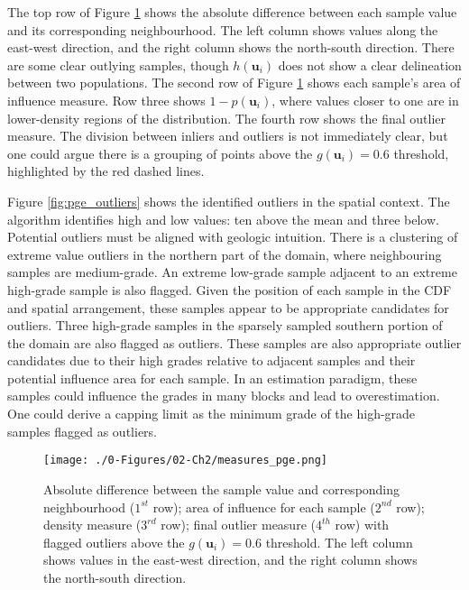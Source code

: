The top row of Figure \ref{fig:measures_pge} shows the absolute difference between each sample value and its corresponding neighbourhood. The left column shows values along the east-west direction, and the right column shows the north-south direction. There are some clear outlying samples, though $h(\mathbf{u}_{i})$ does not show a clear delineation between two populations. The second row of Figure \ref{fig:measures_pge} shows each sample's area of influence measure. Row three shows $1-p(\mathbf{u}_{i})$, where values closer to one are in lower-density regions of the distribution. The fourth row shows the final outlier measure. The division between inliers and outliers is not immediately clear, but one could argue there is a grouping of points above the $g(\mathbf{u}_{i})=0.6$ threshold, highlighted by the red dashed lines.

Figure \ref{fig:pge_outliers} shows the identified outliers in the spatial context. The algorithm identifies high and low values: ten above the mean and three below. Potential outliers must be aligned with geologic intuition. There is a clustering of extreme value outliers in the northern part of the domain, where neighbouring samples are medium-grade. An extreme low-grade sample adjacent to an extreme high-grade sample is also flagged. Given the position of each sample in the \gls{CDF} and spatial arrangement, these samples appear to be appropriate candidates for outliers. Three high-grade samples in the sparsely sampled southern portion of the domain are also flagged as outliers. These samples are also appropriate outlier candidates due to their high grades relative to adjacent samples and their potential influence area for each sample. In an estimation paradigm, these samples could influence the grades in many blocks and lead to overestimation. One could derive a capping limit as the minimum grade of the high-grade samples flagged as outliers.

\begin{figure}[t!]
    \centering
    \texttt{[image: ./0-Figures/02-Ch2/measures\_pge.png]}
    \caption{Absolute difference between the sample value and corresponding neighbourhood ($1^{st}$ row); area of influence for each sample ($2^{nd}$ row); density measure ($3^{rd}$ row); final outlier measure ($4^{th}$ row) with flagged outliers above the $g(\mathbf{u}_{i})=0.6$ threshold. The left column shows values in the east-west direction, and the right column shows the north-south direction. }
    \label{fig:measures_pge}
\end{figure}

